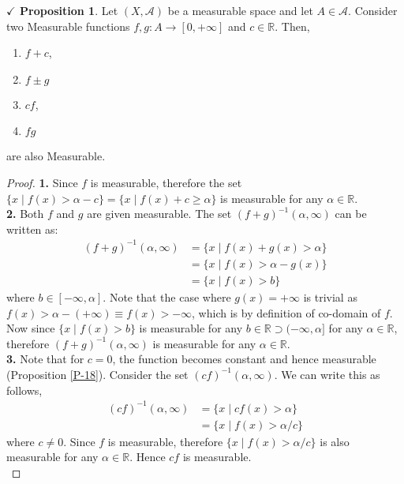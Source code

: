 \documentclass{article}
\theoremstyle{definition}
\theoremstyle{remark}
\theoremstyle{definition}
\theoremstyle{definition}
\newtheorem{proposition}{$\checkmark$ Proposition}
\theoremstyle{definition}
\newcommand{\where}{\;\vert\;}
\newcommand{\R}{\mathbb{R}}
\newcommand{\alg}[1]{\mathscr{#1}}
\newcommand{\inv}[1]{{#1}^{-1}}
\begin{document}
\hrulefill
\newpage
\begin{proposition} \label{P-19}
	Let $ (X,\alg{A}) $ be a measurable space and let $ A \in \alg{A}$. Consider two Measurable functions $ f,g : A \longrightarrow [0,+\infty] $ and $ c\in \R $. Then,
	\begin{enumerate}
		\item {$ f+ c $,}
		\item {$ f\pm g $}
		\item {$ cf $,}
		\item {$ fg $}
	\end{enumerate}
are also Measurable.
\end{proposition}
\begin{proof}
	\textbf{1.} Since $ f $ is measurable, therefore the set $ \{x\where f(x) > \alpha- c\} = \{x\where f(x) + c\ge \alpha\} $ is measurable for any $ \alpha \in \R $.\\
	\textbf{2.} Both $ f $ and $ g $ are given measurable. The set $ \inv{(f+g)} (\alpha,\infty) $ can be written as:
	\begin{equation*}
		\begin{split}
			\inv{(f+g)}(\alpha, \infty)  &= \{x \where f(x) + g(x) > \alpha\}\\
			&= \{x\where f(x) > \alpha - g(x)\}\\
			&= \{x\where f(x) > b\}
		\end{split}
	\end{equation*}
where $ b\in [-\infty ,\alpha] $. Note that the case where $ g(x) = +\infty $ is trivial as $ f(x) > \alpha - (+\infty) \equiv f(x) > -\infty$, which is by definition of co-domain of $ f $. Now since $ \{x\where f(x) > b \}$ is measurable for any $ b\in \R \supset (-\infty,\alpha] $ for any $ \alpha\in \R $, therefore $ \inv{(f+g)}(\alpha,\infty) $ is measurable for any $ \alpha\in \R $. \\
\textbf{3.} Note that for $ c=0 $, the function becomes constant and hence measurable (Proposition \ref{P-18}). Consider the set $ \inv{(cf)}(\alpha,\infty)$. We can write this as follows, 
\begin{equation*}
	\begin{split}
		 \inv{(cf)}(\alpha,\infty) &= \{x\where cf(x) > \alpha\}\\
		 &= \{x\where f(x)> \alpha / c\}
	\end{split}
\end{equation*}
where $ c\neq 0 $. Since $ f $ is measurable, therefore $ \{x\where f(x)>\alpha/c\} $ is also measurable for any $ \alpha \in \R $. Hence $ cf $ is measurable.\\

\end{proof}
\end{document}
